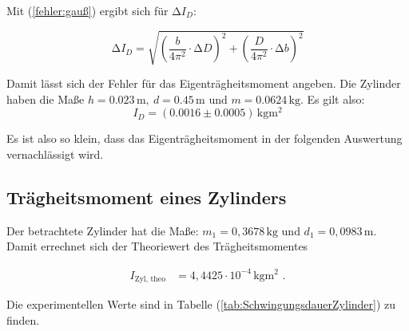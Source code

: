 Mit (\ref{fehler:gauß}) ergibt sich  für $\increment I_{D}$:

\begin{equation*}
  \increment I_{D} = \sqrt{\left(\frac{b}{4 \pi^2} \cdot  \increment D\right)^2 + \left(\frac{D}{4 \pi^2} \cdot  \increment b\right)^2}
\end{equation*}


Damit lässt sich der Fehler für das Eigenträgheitsmoment angeben.
Die Zylinder haben die Maße $h = 0.023 \, \unit{\meter}, \: d = 0.45 \, \unit{\meter} \text{ und } m = 0.0624 \, \unit{\kilo\gram}$.
Es gilt also:
\begin{equation*}
  I_{D} =  (0.0016 \pm 0.0005) \, \unit{\kilo\gram\meter\squared}
\end{equation*}

Es ist also so klein, dass das Eigenträgheitsmoment in der folgenden Auswertung vernachlässigt wird.


\subsection{Trägheitsmoment eines Zylinders}
\label{sec:TraegZylinder}

Der betrachtete Zylinder hat die Maße: $m_1 = 0,3678 \, \unit{\kilo\gram}$ und $d_1 = 0,0983 \, \unit{\meter}$.
Damit errechnet sich der Theoriewert des Trägheitsmomentes

\begin{align*}
  I_{\text{Zyl, theo}} &= 4,4425 \cdot 10^{-4} \, \unit{\kilo\gram\meter\squared} \text{ .}
\end{align*}

Die experimentellen Werte sind in Tabelle (\ref{tab:SchwingungsdauerZylinder}) zu finden.

